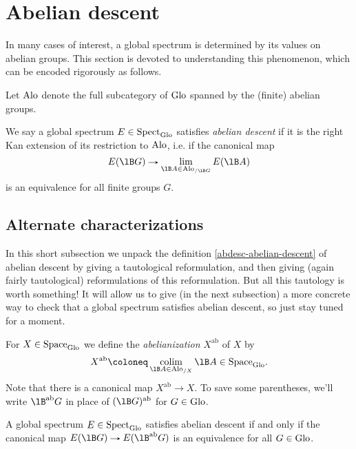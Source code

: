 \section{Abelian descent}
\label{abdesc}

In many cases of interest, a global spectrum is determined by its
values on abelian groups. This section is devoted to understanding
this phenomenon, which can be encoded rigorously as follows.

\begin{notation}
  \label{abdesc-alo}
  Let $\mathrm{Alo}$ denote the full subcategory of $\mathrm{Glo}$ spanned by the
  (finite) abelian groups.
\end{notation}

\begin{definition}
  \label{abdesc-abelian-descent}
  We say a global spectrum $E \in \mathrm{Spect}_{\mathrm{Glo}}$ satisfies \emph{abelian
    descent} if it is the right Kan extension of its restriction to
  $\mathrm{Alo}$, i.e. if the canonical map
  \[
  E(\lB G) \to \lim_{\lB A \in \Alo_{/\lB G}} E(\lB A)
  \]
  is an equivalence for all finite groups $G$.
\end{definition}

\subsection{Alternate characterizations}
\label{abdesc-alternate}

In this short subsection we unpack the definition
\cref{abdesc-abelian-descent} of abelian descent by giving a
tautological reformulation, and then giving (again fairly
tautological) reformulations of this reformulation. But all this
tautology is worth something! It will allow us to give (in the next
subsection) a more concrete way to check that a global spectrum
satisfies abelian descent, so just stay tuned for a moment.

\newcommand{\ab}{\mathrm{ab}}

\begin{definition}
  \label{abdesc-abelianization}
  For $X \in \mathrm{Space}_{\mathrm{Glo}}$ we define the \emph{abelianization} $X^\ab$
  of $X$ by
  \[
  X^\ab \ce \colim_{\lB A \in \Alo_{/X}} \lB A \in \Space_\Glo.
  \]
  Note that there is a canonical map $X^\ab \to X$. To save some
  parentheses, we'll write $\lB^\ab G$ in place of $(\lB G)^\ab$ for
  $G \in \mathrm{Glo}$.
\end{definition}

\begin{lemma}
  \label{abdesc-abelian-descent-abelianization}
  A global spectrum $E \in \mathrm{Spect}_{\mathrm{Glo}}$ satisfies abelian descent if
  and only if the canonical map $E(\lB G) \to E(\lB^\ab G)$ is an
  equivalence for all $G \in \mathrm{Glo}$.
\end{lemma}

